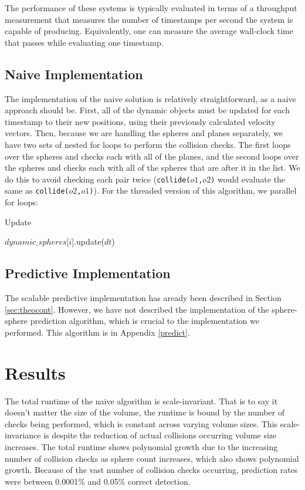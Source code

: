 \documentclass[conference]{IEEEtran}
\begin{document}
The performance of these systems is typically evaluated in terms of a throughput measurement that measures the number of timestamps per second the system is capable of producing.  Equivalently, one can measure the average wall-clock time that passes while evaluating one timestamp.

\subsection{Naive Implementation}

The implementation of the naive solution is relatively straightforward, as a naive approach should be.  First, all of the dynamic objects must be updated for each timestamp to their new positions, using their previously calculated velocity vectors.  Then, because we are handling the spheres and planes separately, we have two sets of nested for loops to perform the collision checks.  The first loops over the spheres and checks each with all of the planes, and the second loops over the spheres and checks each with all of the spheres that are after it in the list.  We do this to avoid checking each pair twice (\texttt{collide($o1$,$o2$)} would evaluate the same as \texttt{collide($o2$,$o1$)}). For the threaded version of this algorithm, we parallel for loops:

\begin{algorithm}
\caption{Update}
\begin{algorithmic}
	\STATE $dynamic\_spheres$[$i$].update($dt$)
\ENDFOR
\end{algorithmic}
\end{algorithm}

\subsection{Predictive Implementation}

The scalable predictive implementation has aready been described in Section \ref{sec:theocont}.  However, we have not described the implementation of the sphere-sphere prediction algorithm, which is crucial to the 
implementation we performed.  This algorithm is in Appendix \ref{predict}.

\section{Results} %

The total runtime of the naive algorithm is scale-invariant.  That is to say it doesn't matter the size of the volume, the runtime is bound by the number of checks being performed, which is constant across varying volume sizes.  This scale-invariance is despite the reduction of actual collisions occurring volume size increases.  The total runtime shows polynomial growth due to the increasing number of collision checks as sphere count increases, which also shows polynomial growth.  Because of the vast number of collision checks occurring, prediction rates were between 0.0001\% and 0.05\% correct detection.
\end{document}

